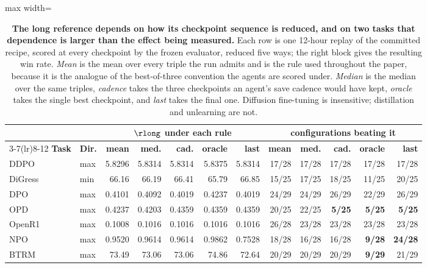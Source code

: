 \begin{table}[t]
\centering
\caption{\textbf{The long reference depends on how its checkpoint sequence is reduced, and on
two tasks that dependence is larger than the effect being measured.} Each row is one 12-hour
replay of the committed recipe, scored at every checkpoint by the frozen evaluator, reduced five
ways; the right block gives the resulting win rate. \emph{Mean} is the mean over every triple the
run admits and is the rule used throughout the paper, because it is the analogue of the
best-of-three convention the agents are scored under. \emph{Median} is the median over the same
triples, \emph{cadence} takes the three checkpoints an agent's save cadence would have kept,
\emph{oracle} takes the single best checkpoint, and \emph{last} takes the final one. Diffusion
fine-tuning is insensitive; distillation and unlearning are not.}
\label{tab:reduction}
\small
\begin{adjustbox}{max width=\linewidth}
\begin{tabular}{llrrrrr rrrrr}
\toprule
& & \multicolumn{5}{c}{\textbf{$\rlong$ under each rule}}
& \multicolumn{5}{c}{\textbf{configurations beating it}} \\
\cmidrule(lr){3-7}\cmidrule(lr){8-12}
\textbf{Task} & \textbf{Dir.} & \textbf{mean} & \textbf{med.} & \textbf{cad.} & \textbf{oracle}
& \textbf{last} & \textbf{mean} & \textbf{med.} & \textbf{cad.} & \textbf{oracle} & \textbf{last} \\
\midrule
DDPO    & max & 5.8296 & 5.8314 & 5.8314 & 5.8375 & 5.8314 & 17/28 & 17/28 & 17/28 & 17/28 & 17/28 \\
DiGress & min & 66.16 & 66.19 & 66.41 & 65.79 & 66.85 & 15/25 & 17/25 & 18/25 & 11/25 & 20/25 \\
DPO     & max & 0.4101 & 0.4092 & 0.4019 & 0.4237 & 0.4019 & 24/29 & 24/29 & 26/29 & 22/29 & 26/29 \\
OPD     & max & 0.4237 & 0.4203 & 0.4359 & 0.4359 & 0.4359 & 20/25 & 22/25 & \textbf{5/25} & \textbf{5/25} & \textbf{5/25} \\
OpenR1  & max & 0.1008 & 0.1016 & 0.1016 & 0.1016 & 0.1016 & 26/28 & 23/28 & 23/28 & 23/28 & 23/28 \\
NPO     & max & 0.9520 & 0.9614 & 0.9614 & 0.9862 & 0.7528 & 18/28 & 16/28 & 16/28 & \textbf{9/28} & \textbf{24/28} \\
BTRM    & max & 73.49 & 73.06 & 73.06 & 74.86 & 72.64 & 20/29 & 20/29 & 20/29 & \textbf{9/29} & 21/29 \\
\bottomrule
\end{tabular}

\end{adjustbox}
\end{table}
